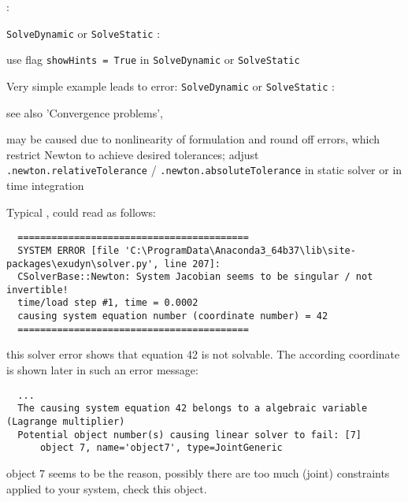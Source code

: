 \noindent {}:
\bi
\item \texttt{SolveDynamic} or \texttt{SolveStatic} :
\bi
\item[$\ra$] use flag \texttt{showHints = True} in \texttt{SolveDynamic} or \texttt{SolveStatic}
\ei
\item Very simple example  leads to error: \texttt{SolveDynamic} or \texttt{SolveStatic} :
\bi
\item[$\ra$] see also 'Convergence problems', 
\item[$\ra$] may be caused due to nonlinearity of formulation and round off errors, which restrict Newton to achieve desired tolerances; adjust  \texttt{.newton.relativeTolerance} / \texttt{.newton.absoluteTolerance} in static solver or in time integration
\ei
\item Typical , could read as follows:
\begin{lstlisting}
  =========================================
  SYSTEM ERROR [file 'C:\ProgramData\Anaconda3_64b37\lib\site-packages\exudyn\solver.py', line 207]: 
  CSolverBase::Newton: System Jacobian seems to be singular / not invertible!
  time/load step #1, time = 0.0002
  causing system equation number (coordinate number) = 42
  =========================================
\end{lstlisting}
%
\bi
\item[$\ra$] this solver error shows that equation 42 is not solvable. The according coordinate is shown later in such an error message:
\ei
\begin{lstlisting}
  ...
  The causing system equation 42 belongs to a algebraic variable (Lagrange multiplier)
  Potential object number(s) causing linear solver to fail: [7]
      object 7, name='object7', type=JointGeneric
\end{lstlisting}
%
\bi
\item[$\ra$] object 7 seems to be the reason, possibly there are too much (joint) constraints applied to your system, check this object.
